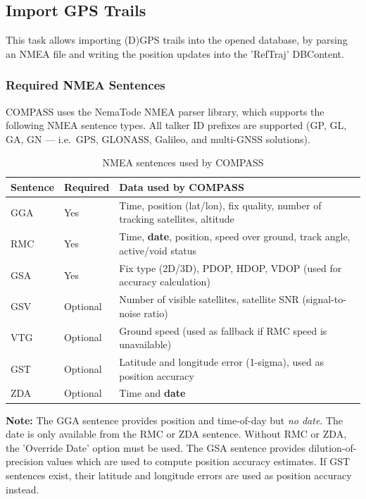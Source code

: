 \subsection{Import GPS Trails}
\label{sec:ui_import_gps}

This task allows importing (D)GPS trails into the opened database, by parsing an NMEA file and writing the position updates into the 'RefTraj' DBContent.

\subsubsection{Required NMEA Sentences}

COMPASS uses the NemaTode NMEA parser library, which supports the following NMEA sentence types. All talker ID prefixes are supported (GP, GL, GA, GN --- i.e.\ GPS, GLONASS, Galileo, and multi-GNSS solutions).

\begin{table}[H]
\centering
\begin{tabular}{|l|l|l|}
\hline
\textbf{Sentence} & \textbf{Required} & \textbf{Data used by COMPASS} \\
\hline
GGA & Yes & Time, position (lat/lon), fix quality, number of tracking satellites, altitude \\
\hline
RMC & Yes & Time, \textbf{date}, position, speed over ground, track angle, active/void status \\
\hline
GSA & Yes & Fix type (2D/3D), PDOP, HDOP, VDOP (used for accuracy calculation) \\
\hline
GSV & Optional & Number of visible satellites, satellite SNR (signal-to-noise ratio) \\
\hline
VTG & Optional & Ground speed (used as fallback if RMC speed is unavailable) \\
\hline
GST & Optional & Latitude and longitude error (1-sigma), used as position accuracy \\
\hline
ZDA & Optional & Time and \textbf{date} \\
\hline
\end{tabular}
\caption{NMEA sentences used by COMPASS}
\end{table}

\textbf{Note:} The GGA sentence provides position and time-of-day but \textit{no date}. The date is only available from the RMC or ZDA sentence. Without RMC or ZDA, the 'Override Date' option must be used. The GSA sentence provides dilution-of-precision values which are used to compute position accuracy estimates. If GST sentences exist, their latitude and longitude errors are used as position accuracy instead. \\

